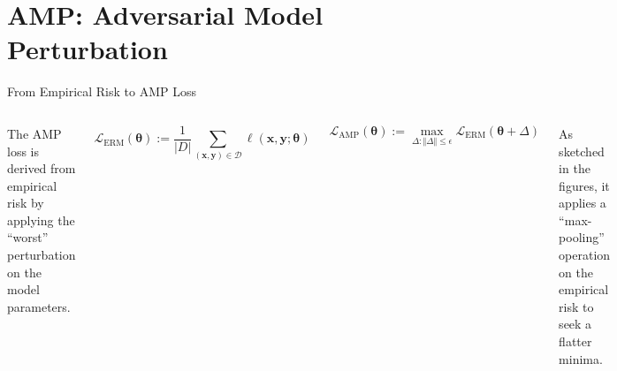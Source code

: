 \section{AMP: Adversarial Model Perturbation}


\begin{frame}{From Empirical Risk to AMP Loss}

\begin{columns}

The AMP loss is derived from empirical risk by applying the ``worst'' perturbation on the model parameters.

\begin{equation}
\mathcal{L}_\mathrm{ERM}(\boldsymbol{\theta}):=\frac{1}{|D|}\sum_{(\boldsymbol{x},\boldsymbol{y})\in\mathcal{D}}\ell(\boldsymbol{x},\boldsymbol{y};\boldsymbol{\theta})
\end{equation}

\begin{equation}
\mathcal{L}_\mathrm{AMP}(\boldsymbol{\theta}):=\max_{\Delta:\Vert\Delta\Vert\le\epsilon}\mathcal{L}_\mathrm{ERM}(\boldsymbol{\theta}+\Delta)
\end{equation}

As sketched in the figures, it applies a ``max-pooling'' operation on the empirical risk to seek a flatter minima.

\begin{figure}
\includegraphics[width=.8\textwidth]{figs/loss_example_a.pdf}
\end{figure}


\end{columns}
\end{frame}
